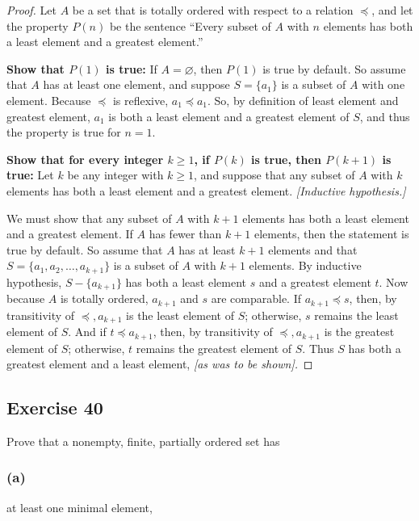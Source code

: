 \documentclass[14pt]{extarticle}
\newcommand{\es}{\varnothing}
\begin{document}
\begin{proof}
        Let $A$ be a set that is totally ordered with respect to a relation \(\preceq\), and let the property \(P(n)\) be the
        sentence “Every subset of $A$ with $n$ elements has both a least element and a greatest element.”

        {\bf Show that \(P(1)\) is true:} If \(A = \es\), then \(P(1)\) is true by default. So assume that \(A\) has at
        least one element, and suppose \(S = \{a_1\}\) is a subset of \(A\) with one element. Because \(\preceq\) is
        reflexive, \(a_1 \preceq a_1\). So, by definition of least element and greatest element, \(a_1\) is both a least
        element and a greatest element of \(S\), and thus the property is true for \(n = 1\).

                {\bf Show that for every integer \(k \geq 1\), if \(P(k)\) is true, then \(P(k + 1)\) is true:} Let $k$ be any integer
        with \(k \geq 1\), and suppose that any subset of $A$ with $k$ elements has both a least element and a greatest
        element. {\it [Inductive hypothesis.]}

        We must show that any subset of $A$ with \(k + 1\) elements has both a least element and a greatest element. If $A$ has
        fewer than \(k + 1\) elements, then the statement is true by default. So assume that $A$ has at least \(k + 1\)
        elements and that \(S = \{a_1, a_2, \ldots, a_{k+1}\}\) is a subset of $A$ with \(k + 1\) elements. By inductive
        hypothesis, \(S - \{a_{k+1}\}\) has both a least element $s$ and a greatest element $t$. Now because $A$ is totally
        ordered, \(a_{k+1}\) and $s$ are comparable. If \(a_{k+1} \preceq s\), then, by transitivity of \(\preceq, a_{k+1}\)
        is the least element of $S$; otherwise, $s$ remains the least element of $S$. And if \(t \preceq a_{k+1}\), then,
        by transitivity of \(\preceq, a_{k+1}\) is the greatest element of $S$; otherwise, $t$ remains the greatest element
        of $S$. Thus $S$ has both a greatest element and a least element, {\it [as was to be shown].}
\end{proof}

\subsection{Exercise 40}
Prove that a nonempty, finite, partially ordered set has

\subsubsection{(a)}
at least one minimal element,
\end{document}
